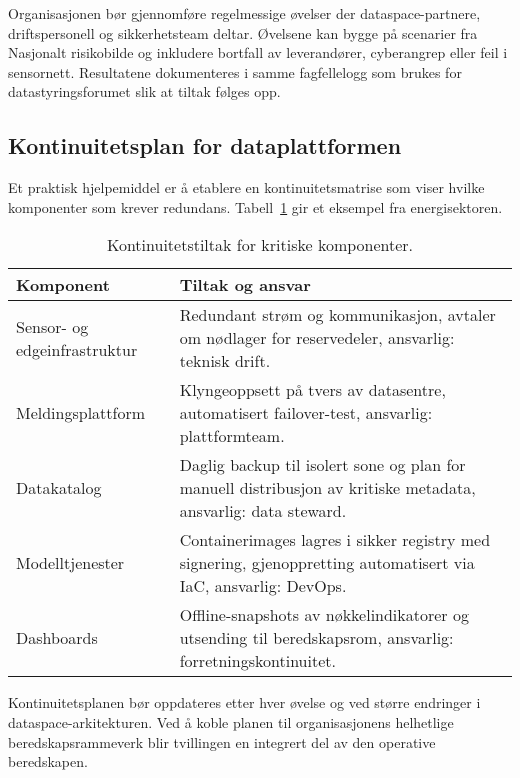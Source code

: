 Organisasjonen bør gjennomføre regelmessige øvelser der dataspace-partnere, driftspersonell og sikkerhetsteam deltar. Øvelsene
kan bygge på scenarier fra Nasjonalt risikobilde og inkludere bortfall av leverandører, cyberangrep eller feil i sensornett.
Resultatene dokumenteres i samme fagfellelogg som brukes for datastyringsforumet slik at tiltak følges opp.

\subsection{Kontinuitetsplan for dataplattformen}
Et praktisk hjelpemiddel er å etablere en kontinuitetsmatrise som viser hvilke komponenter som krever redundans. Tabell~\ref{tab:kap03-kontinuitet}
gir et eksempel fra energisektoren.

\begin{table}[ht]
    \centering
    \caption{Kontinuitetstiltak for kritiske komponenter.}
    \label{tab:kap03-kontinuitet}
    \begin{tabular}{p{}p{}}
        \toprule
        \textbf{Komponent} & \textbf{Tiltak og ansvar} \\
        \midrule
        Sensor- og edgeinfrastruktur & Redundant strøm og kommunikasjon, avtaler om nødlager for reservedeler, ansvarlig: teknisk drift. \\
        Meldingsplattform & Klyngeoppsett på tvers av datasentre, automatisert failover-test, ansvarlig: plattformteam. \\
        Datakatalog & Daglig backup til isolert sone og plan for manuell distribusjon av kritiske metadata, ansvarlig: data steward. \\
        Modelltjenester & Containerimages lagres i sikker registry med signering, gjenoppretting automatisert via IaC, ansvarlig: DevOps. \\
        Dashboards & Offline-snapshots av nøkkelindikatorer og utsending til beredskapsrom, ansvarlig: forretningskontinuitet. \\
        \bottomrule
    \end{tabular}
\end{table}

Kontinuitetsplanen bør oppdateres etter hver øvelse og ved større endringer i dataspace-arkitekturen. Ved å koble planen til
organisasjonens helhetlige beredskapsrammeverk blir tvillingen en integrert del av den operative beredskapen.

